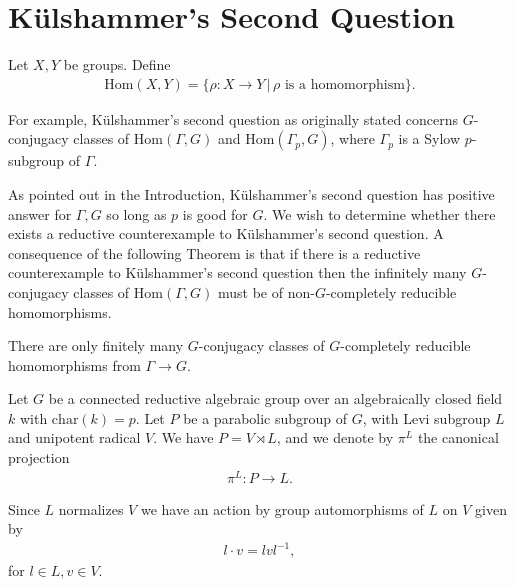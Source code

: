 
\chapter{K\"ulshammer's Second Question}
\label{Chapter4}

\begin{definition} Let $X,Y$ be groups. Define
\begin{align*} \mathrm{Hom}(X, Y) = \{ \rho : X \rightarrow Y \,|\, \rho \textrm{ is a homomorphism}\}. 
\end{align*}
\end{definition}

For example, K\"ulshammer's second question as originally stated concerns $G$-conjugacy classes of $\mathrm{Hom}(\Gamma, G)$ and $\mathrm{Hom}(\Gamma_p, G)$, where $\Gamma_p$ is a Sylow $p$-subgroup of $\Gamma$.

As pointed out in the Introduction, K\"ulshammer's second question has positive answer for $\Gamma, G$ so long as $p$ is good for $G$. We wish to determine whether there exists a reductive counterexample to K\"ulshammer's second question.
A consequence of the following Theorem \cite[Theorem 1.2]{martin2003reductive} is that if there is a reductive counterexample to K\"ulshammer's second question then the infinitely many $G$-conjugacy classes of $\mathrm{Hom}(\Gamma, G)$ must be of non-$G$-completely reducible homomorphisms.

\begin{theorem} \label{thm:finiteGCR} There are only finitely many $G$-conjugacy classes of $G$-completely reducible homomorphisms from $\Gamma\rightarrow G$.
\end{theorem}
Let $G$ be a connected reductive algebraic group over an algebraically closed field $k$ with $\mathrm{char}(k) = p$. Let $P$ be a parabolic subgroup of $G$, with Levi subgroup $L$ and unipotent radical $V$. We have $P = V \rtimes L$, and we denote by $\pi^L$ the canonical projection
\begin{align*} \pi^L:P \rightarrow L. \end{align*}

Since $L$ normalizes $V$ we have an action by group automorphisms of $L$ on $V$ given by
\begin{align} \label{laction} l \cdot v = lvl^{-1}, \end{align}
for $l \in L, v \in V$.

